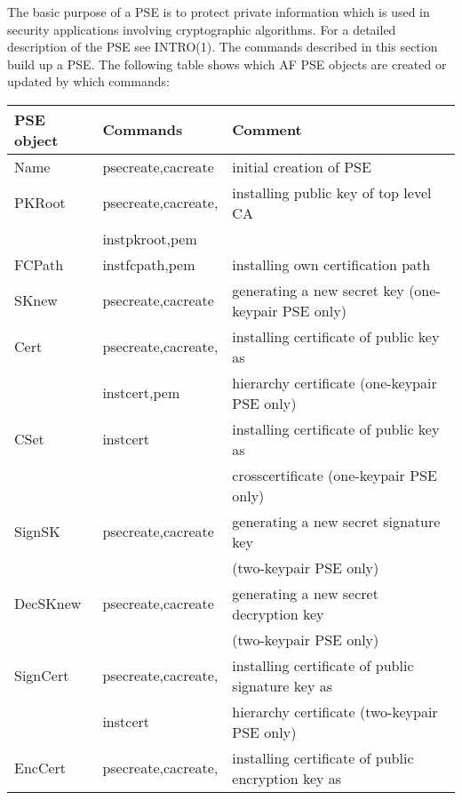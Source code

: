 The basic purpose of a PSE is to protect private information which is used
in security applications involving cryptographic algorithms. For a detailed 
description of the PSE see INTRO(1). The commands described in this
section build up a PSE. The following table shows which AF PSE objects are created or updated
by which commands:
{\small
\begin{tabular}{|l|l|l|} \hline 
PSE object   & Commands            & Comment                                             \\ \hline
Name         & psecreate,cacreate  & initial creation of PSE                             \\
PKRoot       & psecreate,cacreate, & installing public key of top level CA               \\
             & instpkroot,pem      &                                                     \\
FCPath       & instfcpath,pem      & installing own certification path                   \\
SKnew        & psecreate,cacreate  & generating a new secret key (one-keypair PSE only)  \\
Cert         & psecreate,cacreate, & installing certificate of public key as             \\
             & instcert,pem        & hierarchy certificate (one-keypair PSE only)        \\
CSet         & instcert            & installing certificate of public key as             \\
             &                     & crosscertificate (one-keypair PSE only)             \\
SignSK       & psecreate,cacreate  & generating a new secret signature key               \\
             &                     & (two-keypair PSE only)                              \\
DecSKnew     & psecreate,cacreate  & generating a new secret decryption key              \\
             &                     & (two-keypair PSE only)                              \\
SignCert     & psecreate,cacreate, & installing certificate of public signature key as   \\
             & instcert            & hierarchy certificate (two-keypair PSE only)        \\
EncCert      & psecreate,cacreate, & installing certificate of public encryption key as  \\

\end{tabular}}
